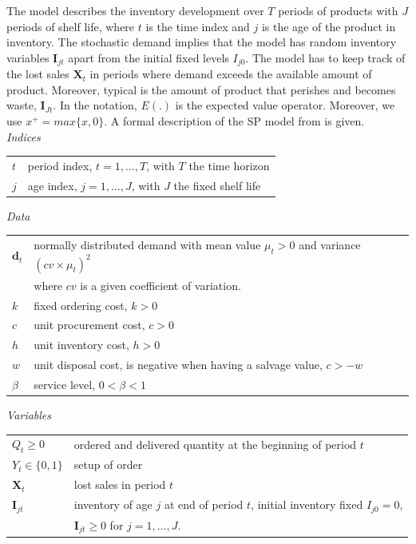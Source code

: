 The model describes the inventory development over $T$ periods of products with $J$ periods of shelf life, where $t$ is the time index and $j$ is the age of the product in inventory. The stochastic demand implies that the model has random inventory variables $\boldsymbol{I}_{jt}$ apart from the initial fixed levels $I_{j0}$. The model has to keep track of the lost sales $\boldsymbol{X}_t$ in periods where demand exceeds the available amount of product. Moreover, typical is the amount of product that perishes and becomes waste, $\boldsymbol{I}_{Jt}$. In the notation, %
$E(.)$ is the expected value operator. Moreover,  we use $x^+=max\{x,0\}$. A formal description of the SP model from \cite{PAULS14} is given.\\

\smallskip\noindent\emph{Indices}\\
\begin{tabular}{ll}
$t$ & period index, $t=1,\ldots,T$, with $T$ the time horizon\\
$j$ & age index, $j=1,\ldots,J$, with $J$ the fixed shelf life\\
\end{tabular}


\smallskip\noindent\emph{Data}\\
\begin{tabular}{ll}
$\boldsymbol{d}_t$ &
normally distributed demand with mean value $\mu_t>0$ and variance  $(cv\times \mu_t)^2$\\
& where $cv$ is a given coefficient of variation.\\
$k$ & fixed ordering cost, $k>0$\\
$c$ & unit procurement cost, $c>0$\\
$h$ & unit inventory cost, $h>0$\\
$w$ & unit disposal cost, is negative when having a salvage value, $c>-w$\\
$\beta$ & service level, $0<\beta<1$
\end{tabular}


\smallskip\noindent\emph{Variables}\\
\begin{tabular}{ll}
$Q_t \ge 0$ & ordered and delivered quantity at the beginning of period $t$\\
$Y_t \in \{0,1\}$ & setup of order\\
$\boldsymbol{X}_t$ & lost sales in period $t$\\
$\boldsymbol{I}_{jt}$ & inventory of age $j$ at end of period $t$, initial inventory fixed  $I_{j0}=0$,\\
 & $\boldsymbol{I}_{jt} \ge 0$ for $j=1,\ldots,J$.\\
\end{tabular}

